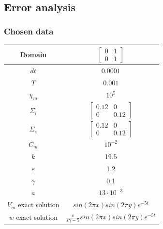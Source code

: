 \documentclass[9pt]{beamer}
\begin{document}
\begin{frame}
\section{Error analysis}
\frametitle{Chosen data}
\begin{center}
	\begin{tabular}{|c|c|} 
		\hline 
		Domain & $\begin{bmatrix} 0 & 1 \\ 0 & 1 \end{bmatrix}$ \\
		\hline 
		$dt$ & $0.0001$ \\
		\hline
		$T$ & $0.001$ \\
		\hline
		$\chi_m$ & $10^5$ \\
		\hline
		$\Sigma_i$ & $\begin{bmatrix} 0.12 & 0 \\ 0 & 0.12 \end{bmatrix}$ \\
		\hline
		$\Sigma_e$ & $\begin{bmatrix} 0.12 & 0 \\ 0 & 0.12 \end{bmatrix}$ \\
		\hline
		$C_m$ & $10^{-2}$ \\
		\hline
		$k$ & 19.5 \\ 
		\hline
		$\varepsilon$ & 1.2 \\
		\hline
		$\gamma$ & 0.1 \\
		\hline
		$a$ & $13 \cdot 10^{-3}$ \\
		\hline
		$V_m$ exact solution & $sin(2 \pi x) sin(2 \pi y) e^{-5 t}$ \\
		\hline
		$w$ exact solution & $\frac{\varepsilon}{\varepsilon \gamma-5} sin(2 \pi x) sin(2 \pi y) e^{-5 t}$ \\
		\hline
		
	\end{tabular}
\end{center}
\end{frame}
\end{document}

